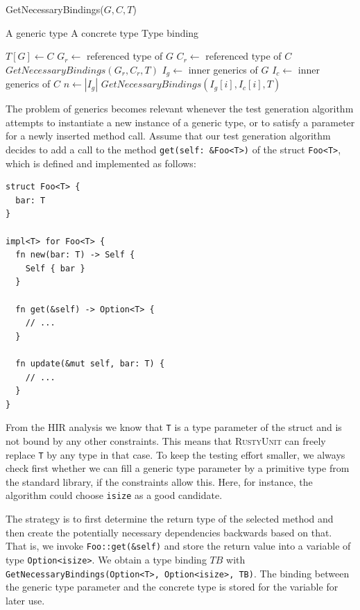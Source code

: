 \documentclass[paper=a4,%
  twoside,%
  BCOR4mm,%
  abstract=true,%
  toc=bibliography,%
  chapterprefix=true,%
  toc=bibliographynumbered,%
  open=right,%
  english,%
  pagesize=pdftex]{scrreprt}
\newcommand{\Desc}[2]{\State \makebox[2em][l]{#1}#2}
\newcommand{\tech}{\textsc{RustyUnit}\xspace}
\newcommand{\hir}{\ac{HIR}\xspace}
\begin{document}
\begin{algorithm}[t]
  \caption{GetNecessaryBindings($G, C, T$)}\label{alg:get-necessary-bindings}
\begin{algorithmic}
\Input
  \Desc{$G$}{A generic type}
  \Desc{$C$}{A concrete type}
  \Desc{$T$}{Type binding}
\EndInput

\State $T[G] \gets C$
\Else
    \State $G_r \gets $ referenced type of $G$
    \State $C_r \gets $ referenced type of $C$
    \State $GetNecessaryBindings(G_r, C_r, T)$
  \Else
    \State $I_g \gets $ inner generics of $G$
    \State $I_c \gets $ inner generics of $C$
    \State $n \gets \left| I_g \right|$
      \State $GetNecessaryBindings(I_g[i], I_c[i], T)$
    \EndFor
  \EndIf
\EndIf
\end{algorithmic}
\end{algorithm}

The problem of generics becomes relevant whenever the test generation algorithm attempts to instantiate a new instance of a generic type, or to satisfy a parameter for a newly inserted method call. Assume that our test generation algorithm decides to add a call to the method \texttt{get(self: \&Foo<T>)} of the struct \texttt{Foo<T>}, which is defined and implemented as follows:
\begin{lstlisting}[style=boxed, caption={}, label=lst:basic-generics-example]
struct Foo<T> {
  bar: T
}

impl<T> for Foo<T> {
  fn new(bar: T) -> Self {
    Self { bar }
  }

  fn get(&self) -> Option<T> {
    // ...
  }

  fn update(&mut self, bar: T) {
    // ...
  }
}
\end{lstlisting}

From the \hir analysis we know that \texttt{T} is a type parameter of the struct and is not bound by any other constraints. This means that \tech can freely replace \texttt{T} by any type in that case. To keep the testing effort smaller, we always check first whether we can fill a generic type parameter by a primitive type from the standard library, if the constraints allow this. Here, for instance, the algorithm could choose \texttt{isize} as a good candidate.

The strategy is to first determine the return type of the selected method and then create the potentially necessary dependencies backwards based on that. That is, we invoke \texttt{Foo::get(\&self)} and store the return value into a variable of type \texttt{Option<isize>}. We obtain a type binding $TB$ with \texttt{GetNecessaryBindings(Option<T>, Option<isize>, TB)}. The binding \texttt{} between the generic type parameter and the concrete type is stored for the variable for later use.
\end{document}
